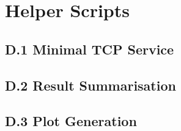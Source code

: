 \chapter{Helper Scripts}
\label{ch:appendix-helper}

\section*{D.1 \quad Minimal TCP Service}


\section*{D.2 \quad Result Summarisation}


\section*{D.3 \quad Plot Generation}

